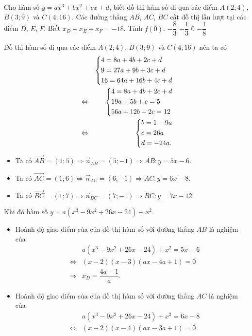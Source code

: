 \begin{ex}%
	Cho hàm số $y=ax^3+bx^2+cx+d$, biết đồ thị hàm số đi qua các điểm $A(2;4)$, $B(3;9)$ và $C(4;16)$. Các đường thẳng $AB$, $AC$, $BC$ cắt đồ thị lần lượt tại các điểm $D$, $E$, $F$. Biết $x_D+x_E+x_F=-18$. Tính $f(0)$.
	\choice
	{\True $-\dfrac{8}{3}$}
	{$-\dfrac{1}{3}$}
	{$0$}
	{$-\dfrac{1}{8}$}
	\loigiai
	{
		Đồ thị hàm số đi qua các điểm $A(2;4)$, $B(3;9)$ và $C(4;16)$ nên ta có
		\begin{eqnarray*}
			& &\left\{\begin{aligned}&4=8a+4b+2c+d\\&9=27a+9b+3c+d\\&16=64a+16b+4c+d\end{aligned}\right.\\
			&\Leftrightarrow &\left\{\begin{aligned}&4=8a+4b+2c+d\\&19a+5b+c=5\\&56a+12b+2c=12\end{aligned}\right.\\
			& \Leftrightarrow &\left\{\begin{aligned}&b=1-9a\\&c=26a\\&d=-24a.\end{aligned}\right. 
		\end{eqnarray*}
		\begin{itemize}
			\item Ta có $\overrightarrow{AB}=(1;5)\Rightarrow \overrightarrow{n}_{AB}=(5;-1)\Rightarrow AB\colon y=5x-6.$
			\item Ta có $\overrightarrow{AC}=(1;6)\Rightarrow \overrightarrow{n}_{AC}=(6;-1)\Rightarrow AC\colon y=6x-8.$
			\item Ta có $\overrightarrow{BC}=(1;7)\Rightarrow \overrightarrow{n}_{BC}=(7;-1)\Rightarrow BC\colon y=7x-12.$
		\end{itemize}
		Khi đó hàm số $y=a(x^3-9x^2+26x-24)+x^2.$
		\begin{itemize}
			\item Hoành độ giao điểm của của đồ thị hàm số với đường thẳng $AB$ là nghiệm của 
			\begin{eqnarray*}
				& &a(x^3-9x^2+26x-24)+x^2=5x-6\\
				&\Leftrightarrow &(x-2)(x-3)\left(ax-4a+1\right)=0\\
				&\Rightarrow &x_D=\dfrac{4a-1}{a}.
			\end{eqnarray*}
			\item Hoành độ giao điểm của của đồ thị hàm số với đường thẳng $AC$ là nghiệm của 
			\begin{eqnarray*}
				& &a(x^3-9x^2+26x-24)+x^2=6x-8\\
				&\Leftrightarrow &(x-2)(x-4)\left(ax-3a+1\right)=0\\

\end{eqnarray*}
\end{itemize}}
\end{ex}
